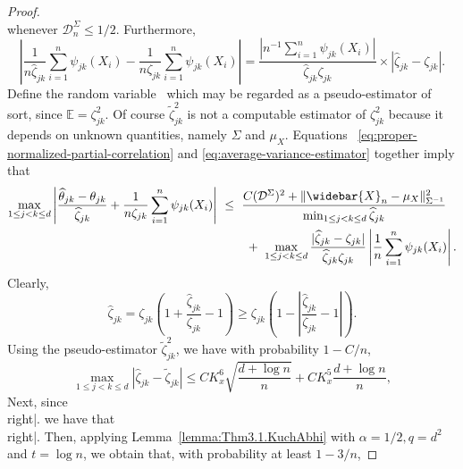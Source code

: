\documentclass{article}
\begin{document}
\begin{appendices}
\begin{proof}
\begin{equation}
\end{equation}
whenever $\mathcal{D}_n^{\Sigma} \le 1/2$. Furthermore,
\begin{equation}\label{eq:average-variance-estimator}
\left|\frac{1}{n\widehat{\zeta}_{jk}}\sum_{i=1}^n \psi_{jk}(X_i) - \frac{1}{n\zeta_{jk}}\sum_{i=1}^n \psi_{jk}(X_i)\right| = \frac{|n^{-1}\sum_{i=1}^n \psi_{jk}(X_i)|}{\widehat{\zeta}_{jk}\zeta_{jk}}\times|\widehat{\zeta}_{jk} - \zeta_{jk}|.
\end{equation}
Define the random variable
\ which may be regarded as a pseudo-estimator of sort, since $\mathbb{E} = \zeta^2_{jk}$. Of course $\widetilde{\zeta}_{jk}^2$ is not a computable
estimator of $\zeta^2_{jk}$ because it depends on unknown quantities, namely $\Sigma$ and $\mu_X$.
Equations ~\eqref{eq:proper-normalized-partial-correlation} and \eqref{eq:average-variance-estimator} together imply that
\begin{equation}\label{eq:combination-influence-fn-exp-partial-correlation}
\begin{split}
\max_{1\le j < k\le d}\left|\frac{\widehat{\theta}_{jk} - \theta_{jk}}{\widehat{\zeta}_{jk}} + \frac{1}{n\zeta_{jk}}\sum_{i=1}^n \psi_{jk}(X_i)\right| ~&\le~ \frac{C(\mathcal{D}^{\Sigma})^2 + \|\widebar{X}_n - \mu_X\|_{\Sigma^{-1}}^2}{\min_{1\le j < k\le d}\widehat{\zeta}_{jk}}\\ ~&\qquad+~ \max_{1\le j < k\le d}\frac{|\widehat{\zeta}_{jk} - \zeta_{jk}|}{\widehat{\zeta}_{jk}\zeta_{jk}}\left|\frac{1}{n}\sum_{i=1}^n \psi_{jk}(X_i)\right|.
\end{split}
\end{equation}
Clearly,
\begin{equation}\label{eq:bound-hat.sigma-sigma}
\widehat{\zeta}_{jk} = \zeta_{jk}\left(1 + \frac{\widehat{\zeta}_{jk}}{\zeta_{jk}} - 1\right) \ge \zeta_{jk}\left(1 - \left|\frac{\widehat{\zeta}_{jk}}{\zeta_{jk}} - 1\right|\right).
\end{equation}
Using the pseudo-estimator $\widetilde{\zeta}_{jk}^2$, we have with probability $1 - C/n$,
\begin{equation}\label{eq:sigma-hat-to-sigma-tilde}
\max_{1\le j < k\le d}|\widehat{\zeta}_{jk} - \widetilde{\zeta}_{jk}| \le CK_x^6\sqrt{\frac{d + \log n}{n}} + CK_x^5\frac{d + \log n}{n},
\end{equation}
Next, since
\\right|.
\]
we have that
\\right|.
\]
Then, applying
Lemma~\ref{lemma:Thm3.1.KuchAbhi} with $\alpha = 1/2, q = d^2$ and $t = \log n$,
we obtain that, with probability at least $1 - 3/n$,

\end{proof}
\end{appendices}
\end{document}
